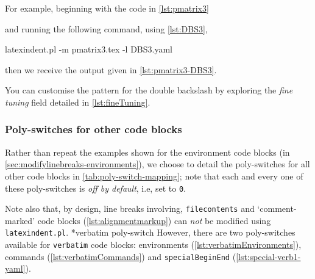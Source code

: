   \begin{example}
  For example, beginning with the code in \cref{lst:pmatrix3}


  and running the following command, using \cref{lst:DBS3},  

  \begin{commandshell}
latexindent.pl -m pmatrix3.tex -l DBS3.yaml
\end{commandshell}

  then we receive the output given in \cref{lst:pmatrix3-DBS3}.

  \end{example}

  You can customise the pattern for the double backslash by exploring the \emph{fine
  tuning} field detailed in \vref{lst:fineTuning}.

\subsubsection{Poly-switches for other code blocks}
 Rather than repeat the examples shown for the environment code blocks (in
 \vref{sec:modifylinebreaks-environments}), we choose to detail the poly-switches for all
 other code blocks in \cref{tab:poly-switch-mapping}; note that each and every one of
 these poly-switches is \emph{off by default}, i.e, set to \texttt{0}.

 Note also that, by design, line breaks involving, \texttt{filecontents} and
 `comment-marked' code blocks (\vref{lst:alignmentmarkup}) can \emph{not} be modified
 using \texttt{latexindent.pl}. *{verbatim poly-switch} However,
 there are two poly-switches available for \texttt{verbatim} code blocks: environments
 (\vref{lst:verbatimEnvironments}), commands (\vref{lst:verbatimCommands}) and
 \texttt{specialBeginEnd} (\vref{lst:special-verb1-yaml}).
  

